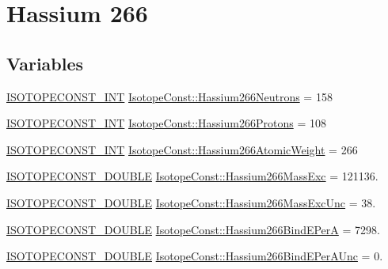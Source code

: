 \hypertarget{group___isotope_const-_hassium-_hs266}{}\section{Hassium 266}
\label{group___isotope_const-_hassium-_hs266}
\subsection*{Variables}
\begin{DoxyCompactItemize}
\item 
\mbox{\hyperlink{group___isotope_const-_macros_ga5f18360b3e99483a35c32d789e62621c}{I\+S\+O\+T\+O\+P\+E\+C\+O\+N\+S\+T\+\_\+\+I\+NT}} \mbox{\hyperlink{group___isotope_const-_hassium-_hs266_ga16fa44f374bd7fd018a875c73c6335da}{Isotope\+Const\+::\+Hassium266\+Neutrons}} = 158
\item 
\mbox{\hyperlink{group___isotope_const-_macros_ga5f18360b3e99483a35c32d789e62621c}{I\+S\+O\+T\+O\+P\+E\+C\+O\+N\+S\+T\+\_\+\+I\+NT}} \mbox{\hyperlink{group___isotope_const-_hassium-_hs266_ga57367dc26917c229d6660b47fc2858de}{Isotope\+Const\+::\+Hassium266\+Protons}} = 108
\item 
\mbox{\hyperlink{group___isotope_const-_macros_ga5f18360b3e99483a35c32d789e62621c}{I\+S\+O\+T\+O\+P\+E\+C\+O\+N\+S\+T\+\_\+\+I\+NT}} \mbox{\hyperlink{group___isotope_const-_hassium-_hs266_ga62526f21c065a873878953a5176e1172}{Isotope\+Const\+::\+Hassium266\+Atomic\+Weight}} = 266
\item 
\mbox{\hyperlink{group___isotope_const-_macros_ga8f45a7272ce02c0b4c65c44636ed719a}{I\+S\+O\+T\+O\+P\+E\+C\+O\+N\+S\+T\+\_\+\+D\+O\+U\+B\+LE}} \mbox{\hyperlink{group___isotope_const-_hassium-_hs266_gad8f81280425aabe3252cc8cb4fad2ba0}{Isotope\+Const\+::\+Hassium266\+Mass\+Exc}} = 121136.
\item 
\mbox{\hyperlink{group___isotope_const-_macros_ga8f45a7272ce02c0b4c65c44636ed719a}{I\+S\+O\+T\+O\+P\+E\+C\+O\+N\+S\+T\+\_\+\+D\+O\+U\+B\+LE}} \mbox{\hyperlink{group___isotope_const-_hassium-_hs266_gabe425c3de8a784ce6805ec6dc2f9eefa}{Isotope\+Const\+::\+Hassium266\+Mass\+Exc\+Unc}} = 38.
\item 
\mbox{\hyperlink{group___isotope_const-_macros_ga8f45a7272ce02c0b4c65c44636ed719a}{I\+S\+O\+T\+O\+P\+E\+C\+O\+N\+S\+T\+\_\+\+D\+O\+U\+B\+LE}} \mbox{\hyperlink{group___isotope_const-_hassium-_hs266_gaa7716cdb77a08cd86c341a7e835b6f8d}{Isotope\+Const\+::\+Hassium266\+Bind\+E\+PerA}} = 7298.
\item 
\mbox{\hyperlink{group___isotope_const-_macros_ga8f45a7272ce02c0b4c65c44636ed719a}{I\+S\+O\+T\+O\+P\+E\+C\+O\+N\+S\+T\+\_\+\+D\+O\+U\+B\+LE}} \mbox{\hyperlink{group___isotope_const-_hassium-_hs266_ga9f7de40beae22bb5c982b728643d50b4}{Isotope\+Const\+::\+Hassium266\+Bind\+E\+Per\+A\+Unc}} = 0.

\end{DoxyCompactItemize}
